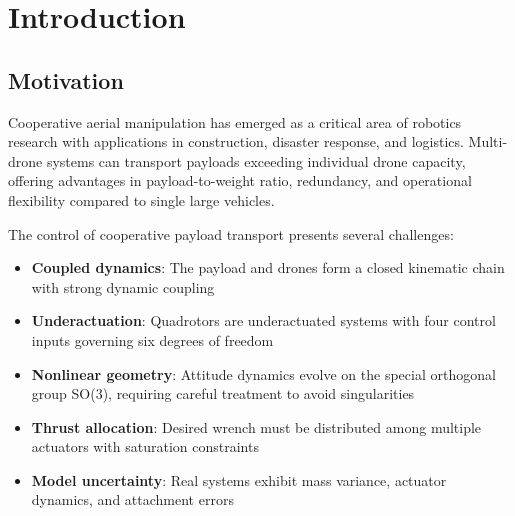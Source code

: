 \documentclass[12pt,a4paper]{article}
\begin{document}
\newpage
\tableofcontents
\clearpage

\section{Introduction}

\subsection{Motivation}
Cooperative aerial manipulation has emerged as a critical area of robotics research with applications in construction, disaster response, and logistics. Multi-drone systems can transport payloads exceeding individual drone capacity, offering advantages in payload-to-weight ratio, redundancy, and operational flexibility compared to single large vehicles.

The control of cooperative payload transport presents several challenges:
\begin{itemize}
    \item \textbf{Coupled dynamics}: The payload and drones form a closed kinematic chain with strong dynamic coupling
    \item \textbf{Underactuation}: Quadrotors are underactuated systems with four control inputs governing six degrees of freedom
    \item \textbf{Nonlinear geometry}: Attitude dynamics evolve on the special orthogonal group SO(3), requiring careful treatment to avoid singularities
    \item \textbf{Thrust allocation}: Desired wrench must be distributed among multiple actuators with saturation constraints
    \item \textbf{Model uncertainty}: Real systems exhibit mass variance, actuator dynamics, and attachment errors
\end{itemize}
\end{document}
